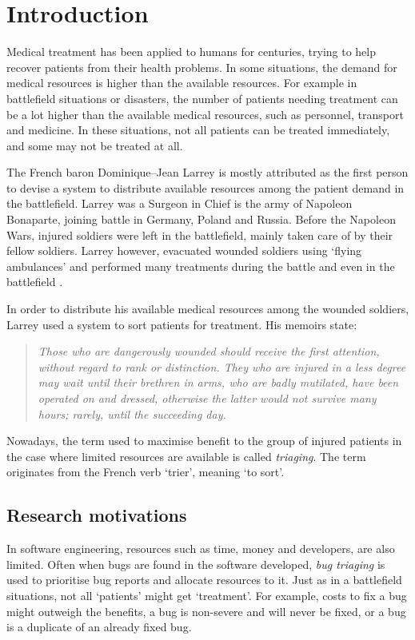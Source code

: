 
\chapter{\label{cha:intro}Introduction}
Medical treatment has been applied to humans for centuries, trying to help recover patients from their health problems. In some situations, the demand for medical resources is higher than the available resources. For example in battlefield situations or disasters, the number of patients needing treatment can be a lot higher than the available medical resources, such as personnel, transport and medicine. In these situations, not all patients can be treated immediately, and some may not be treated at all. 

The French baron Dominique--Jean Larrey is mostly attributed as the first person to devise a system to distribute available resources among the patient demand in the battlefield. Larrey was a Surgeon in Chief is the army of Napoleon Bonaparte, joining battle in Germany, Poland and Russia. Before the Napoleon Wars, injured soldiers were left in the battlefield, mainly taken care of by their fellow soldiers. Larrey however, evacuated wounded soldiers using `flying ambulances' and performed many treatments during the battle and even in the battlefield \cite{Baker2005}. 

In order to distribute his available medical resources among the wounded soldiers, Larrey used a system to sort patients for treatment. His memoirs state: 

\begin{quote}
\emph{Those who are dangerously wounded should receive the first attention, without regard to rank or distinction. They who are injured in a less degree may wait until their brethren in arms, who are badly mutilated, have been operated on and dressed, otherwise the latter would not survive many hours; rarely, until the succeeding day.} \cite{Mackersie}
\end{quote}

Nowadays, the term used to maximise benefit to the group of injured patients in the case where limited resources are available is called \emph{triaging}. The term originates from the French verb `trier', meaning `to sort'. 

\section{Research motivations}
In software engineering, resources such as time, money and developers, are also limited. Often when bugs are found in the software developed, \emph{bug triaging} is used to prioritise bug reports and allocate resources to it. Just as in a battlefield situations, not all `patients' might get `treatment'. For example, costs to fix a bug might outweigh the benefits, a bug is non-severe and will never be fixed, or a bug is a duplicate of an already fixed bug.

